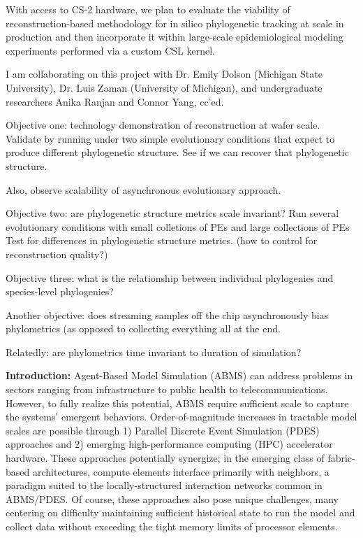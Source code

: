 With access to CS-2 hardware, we plan to evaluate the viability of reconstruction-based methodology for in silico phylogenetic tracking at scale in production and then incorporate it within large-scale epidemiological modeling experiments performed via a custom CSL kernel.

I am collaborating on this project with Dr. Emily Dolson (Michigan State University), Dr. Luis Zaman (University of Michigan), and undergraduate researchers Anika Ranjan and Connor Yang, cc'ed.

Objective one: technology demonstration of reconstruction at wafer scale.
Validate by running under two simple evolutionary conditions that expect to produce different phylogenetic structure.
See if we can recover that phylogenetic structure.

Also, observe scalability of asynchronous evolutionary approach.

Objective two: are phylogenetic structure metrics scale invariant?
Run several evolutionary conditions with small colletions of PEs and large collections of PEs
Test for differences in phylogenetic structure metrics.
(how to control for reconstruction quality?)

Objective three: what is the relationship between individual phylogenies and species-level phylogenies?

Another objective: does streaming samples off the chip asynchronously bias phylometrics (as opposed to collecting everything all at the end.

Relatedly: are phylometrics time invariant to duration of simulation?


\noindent\textbf{Introduction:}
Agent-Based Model Simulation (ABMS) can address problems in sectors ranging from infrastructure to public health to
telecommunications.
However, to fully realize this potential, ABMS require sufficient scale to capture the systems' emergent behaviors.
Order-of-magnitude increases in tractable model scales are possible through 1) Parallel Discrete Event Simulation (PDES) approaches and 2) emerging high-performance computing (HPC) accelerator hardware.
These approaches potentially synergize; in the emerging class of fabric-based architectures, compute elements interface primarily with neighbors, a paradigm suited to the locally-structured interaction networks common in ABMS/PDES.
Of course, these approaches also pose unique challenges, many centering on difficulty maintaining sufficient historical state to run the model and collect data without exceeding the tight memory limits of processor elements.

